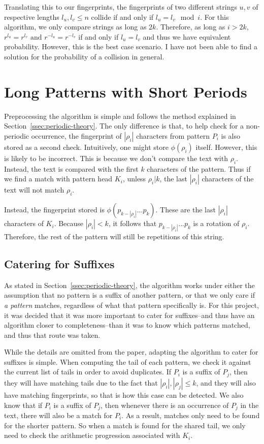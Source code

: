 \documentclass[ %
                    author={Dominic Joseph Moylett},
                    degree={MEng},
                     title={Dictionary Matching with Fingerprints},
                  subtitle={An Empirical Analysis},
                      type={Research},
                      year={2014} ]{dissertation}
\begin{document}
Translating this to our fingerprints, the fingerprints of two different strings $u, v$ of respective lengths $l_u, l_v \leq n$ collide if and only if $l_u = l_v \mod i$. For this algorithm, we only compare strings as long as $2k$. Therefore, as long as $i > 2k$, $r^{l_u} = r^{l_v} \text{ and } r^{-l_u} = r^{-l_v}$ if and only if $l_u = l_v$ and thus we have equivalent probability. However, this is the best case scenario. I have not been able to find a solution for the probability of a collision in general.

\section{Long Patterns with Short Periods}
\label{sec:impl-periodic}

Preprocessing the algorithm is simple and follows the method explained in Section~\ref{ssec:periodic-theory}. The only difference is that, to help check for a non-periodic occurrence, the fingerprint of $|\rho_i|$ characters from pattern $P_i$ is also stored as a second check. Intuitively, one might store $\phi(\rho_i)$ itself. However, this is likely to be incorrect. This is because we don't compare the text with $\rho_i$. Instead, the text is compared with the first $k$ characters of the pattern. Thus if we find a match with pattern head $K_i$, unless $\rho_i | k$, the last $|\rho_i|$ characters of the text will not match $\rho_i$.

Instead, the fingerprint stored is $\phi(p_{k - |\rho_i|}...p_k)$. These are the last $|\rho_i|$ characters of $K_i$. Because $|\rho_i| < k$, it follows that $p_{k - |\rho_i|}...p_k$ is a rotation of $\rho_i$. Therefore, the rest of the pattern will still be repetitions of this string.

\subsection{Catering for Suffixes}

As stated in Section~\ref{ssec:periodic-theory}, the algorithm works under either the assumption that no pattern is a suffix of another pattern, or that we only care if \textit{a pattern} matches, regardless of what that pattern specifically is. For this project, it was decided that it was more important to cater for suffixes--and thus have an algorithm closer to completeness--than it was to know which patterns matched, and thus that route was taken.

While the details are omitted from the paper, adapting the algorithm to cater for suffixes is simple. When computing the tail of each pattern, we check it against the current list of tails in order to avoid duplicates. If $P_i$ is a suffix of $P_j$, then they will have matching tails due to the fact that $|\rho_i|, |\rho_j| \leq k$, and they will also have matching fingerprints, so that is how this case can be detected. We also know that if $P_i$ is a suffix of $P_j$, then whenever there is an occurrence of $P_j$ in the text, there will also be a match for $P_i$. As a result, matches only need to be found for the shorter pattern. So when a match is found for the shared tail, we only need to check the arithmetic progression associated with $K_i$.
\end{document}
